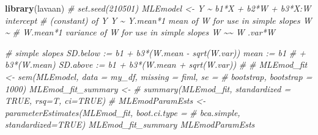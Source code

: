 \documentclass[
  11pt,
]{book}
\newenvironment{Shaded}{\begin{snugshade}}{\end{snugshade}}
\newcommand{\CommentTok}[1]{\textcolor[rgb]{0.37,0.37,0.37}{\textit{#1}}}
\newcommand{\FunctionTok}[1]{\textcolor[rgb]{0.27,0.27,0.27}{\textbf{#1}}}
\newcommand{\NormalTok}[1]{#1}
\begin{document}
\begin{Shaded}
\begin{Highlighting}[]
\FunctionTok{library}\NormalTok{(lavaan)}
\CommentTok{\# set.seed(210501) MLEmodel \textless{}{-} \textquotesingle{} Y \textasciitilde{} b1*X + b2*W + b3*X:W intercept}
\CommentTok{\# (constant) of Y Y \textasciitilde{} Y.mean*1 mean of W for use in simple slopes W \textasciitilde{}}
\CommentTok{\# W.mean*1 variance of W for use in simple slopes W \textasciitilde{}\textasciitilde{} W .var*W}

\CommentTok{\# simple slopes SD.below := b1 + b3*(W.mean {-} sqrt(W.var)) mean := b1}
\CommentTok{\# + b3*(W.mean) SD.above := b1 + b3*(W.mean + sqrt(W.var))}
\CommentTok{\#\textquotesingle{}}
\CommentTok{\# MLEmod\_fit \textless{}{-} sem(MLEmodel, data = my\_df, missing = \textquotesingle{}fiml\textquotesingle{}, se =}
\CommentTok{\# \textquotesingle{}bootstrap\textquotesingle{}, bootstrap = 1000) MLEmod\_fit\_summary \textless{}{-}}
\CommentTok{\# summary(MLEmod\_fit, standardized = TRUE, rsq=T, ci=TRUE)}
\CommentTok{\# MLEmodParamEsts \textless{}{-} parameterEstimates(MLEmod\_fit, boot.ci.type =}
\CommentTok{\# \textquotesingle{}bca.simple\textquotesingle{}, standardized=TRUE) MLEmod\_fit\_summary MLEmodParamEsts}
\end{Highlighting}
\end{Shaded}
\end{document}
